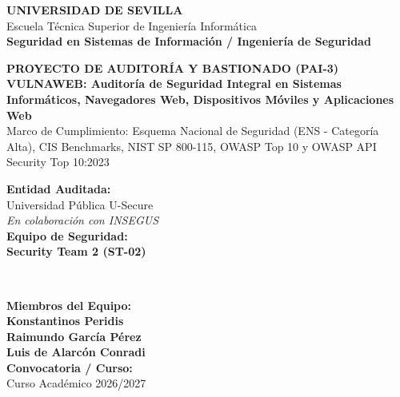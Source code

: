 \documentclass[11pt,a4paper]{article}
\begin{document}
\begin{titlepage}
    \centering
    \vspace*{0.5cm}
    
    {\Huge\bfseries\color{usblue} UNIVERSIDAD DE SEVILLA}\\[0.3cm]
    {\Large\color{darkgray} Escuela Técnica Superior de Ingeniería Informática}\\[0.2cm]
    {\large\color{usgold}\textbf{Seguridad en Sistemas de Información / Ingeniería de Seguridad}}\\[1.5cm]
    
    \begin{tcolorbox}[colback=lightgray,colframe=usblue,arc=4mm,boxrule=1.5pt,width=0.95\textwidth]
        \centering
        \vspace{0.4cm}
        {\LARGE\bfseries\color{usblue} PROYECTO DE AUDITORÍA Y BASTIONADO (PAI-3)}\\[0.3cm]
        {\Large\bfseries\color{secblue} VULNAWEB: Auditoría de Seguridad Integral en Sistemas Informáticos, Navegadores Web, Dispositivos Móviles y Aplicaciones Web}\\[0.3cm]
        {\normalsize\color{darkgray} Marco de Cumplimiento: Esquema Nacional de Seguridad (ENS - Categoría Alta), CIS Benchmarks, NIST SP 800-115, OWASP Top 10 y OWASP API Security Top 10:2023}
        \vspace{0.4cm}
    \end{tcolorbox}
    
    \vspace{1.2cm}
    
    \begin{minipage}{0.48\textwidth}
        \begin{flushleft} \large
            \textbf{\color{usblue}Entidad Auditada:}\\
            Universidad Pública U-Secure\\
            \textit{En colaboración con INSEGUS}\\[0.5cm]
            \textbf{\color{usblue}Equipo de Seguridad:}\\
            \textbf{Security Team 2 (ST-02)}
        \end{flushleft}
    \end{minipage}
    ~
    \begin{minipage}{0.48\textwidth}
        \begin{flushright} \large
            \textbf{\color{usblue}Miembros del Equipo:}\\
            \textbf{Konstantinos Peridis}\\
            \textbf{Raimundo García Pérez}\\
            \textbf{Luis de Alarcón Conradi}\\[0.5cm]
            \textbf{\color{usblue}Convocatoria / Curso:}\\
            Curso Académico 2026/2027
        \end{flushright}
    \end{minipage}
    

\end{titlepage}
\end{document}
